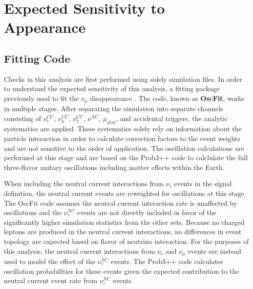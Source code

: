 \section{Expected Sensitivity to Appearance}

\label{subsec:fitter}
\subsection{Fitting Code}

Checks in this analysis are first performed using solely simulation files.
In order to understand the expected sensitivity of this analysis,  {a fitting package previously used to fit the $\nu_\mu$ disappearance} .
The code, known as \textbf{OscFit}, works in multiple stages. 
After separating the simulation into separate channels consisting of $\nu_e^{CC}$, $\nu_\mu^{CC}$, $\nu_\tau^{CC}$, $\nu^{NC}$, $\mu_{atm}$, and accidental triggers, the analytic systematics are applied.
These systematics solely rely on information about the particle interaction in order to calculate correction factors to the event weights and are not sensitive to the order of application.
The oscillation calculations are performed at this stage and are based on the Prob3++ code  to calclulate the full three-flavor unitary oscillations including matter effects within the Earth.

When including the neutral current interactions from $\nu_\tau$ events in the signal definition, the neutral current events are reweighted for oscillations at this stage.
The OscFit code assumes the neutral current interaction rate is unaffected by oscillations and the $\nu_\tau^{NC}$ events are not directly included in favor of the significantly higher simulation statistics from the other sets.
Because no charged leptons are produced in the neutral current interactions, no differences in event topology are expected based on flavor of neutrino interaction.
For the purposes of this analysis, the neutral current interactions from $\nu_e$ and $\nu_\mu$ events are instead used to model the effect of the $\nu_\tau^{NC}$ events.
The Prob3++ code calculates oscillation probabilities for these events given the expected contribution to the neutral current event rate from $\nu_\tau^{NC}$ events.


